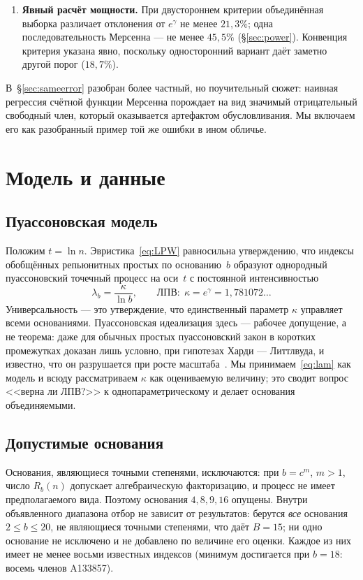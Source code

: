 \documentclass[11pt,a4paper]{article}
\theoremstyle{plain}
\theoremstyle{remark}
\newcommand{\Rb}{R_b}
\newcommand{\eg}{e^{\gamma}}
\begin{document}
\begin{enumerate}
\item\textbf{Явный расчёт мощности.} При двустороннем критерии объединённая
выборка различает отклонения от $\eg$ не менее $21{,}3\%$; одна
последовательность Мерсенна --- не менее $45{,}5\%$ (\S\ref{sec:power}).
Конвенция критерия указана явно, поскольку односторонний вариант даёт
заметно другой порог ($18{,}7\%$).
\end{enumerate}

В~\S\ref{sec:sameerror} разобран более частный, но поучительный сюжет: наивная регрессия
счётной функции Мерсенна порождает на вид значимый отрицательный свободный член,
который оказывается артефактом обусловливания. Мы включаем его как разобранный пример
той же ошибки в ином обличье.

\section{Модель и данные}\label{sec:data}

\subsection{Пуассоновская модель}
Положим $t=\ln n$. Эвристика~\eqref{eq:LPW} равносильна утверждению, что индексы
обобщённых репьюнитных простых по основанию~$b$ образуют однородный пуассоновский
точечный процесс на оси~$t$ с постоянной интенсивностью
\begin{equation}\label{eq:lam}
\lambda_b=\frac{\kappa}{\ln b},\qquad \text{ЛПВ:}\ \ \kappa=\eg=1{,}781072\ldots
\end{equation}
Универсальность --- это утверждение, что единственный параметр $\kappa$ управляет всеми
основаниями. Пуассоновская идеализация здесь --- рабочее допущение, а не теорема:
даже для обычных простых пуассоновский закон в коротких промежутках доказан лишь
условно, при гипотезах Харди --- Литтлвуда, и известно, что он разрушается при росте
масштаба~\cite{jha2026}. Мы принимаем~\eqref{eq:lam} как модель и всюду рассматриваем
$\kappa$ как оцениваемую величину; это сводит вопрос <<верна ли ЛПВ?>> к однопараметрическому и
делает основания объединяемыми.

\subsection{Допустимые основания}\label{sec:bases}
Основания, являющиеся точными степенями, исключаются: при $b=c^{m}$, $m>1$, число
$\Rb(n)$ допускает алгебраическую факторизацию, и процесс не имеет предполагаемого вида.
Поэтому основания $4,8,9,16$ опущены. Внутри объявленного диапазона отбор
не зависит от результатов: берутся \emph{все} основания $2\le b\le20$, не являющиеся
точными степенями, что даёт $B=15$; ни одно основание не исключено и не добавлено
по величине его оценки. Каждое из них имеет не менее восьми известных индексов
(минимум достигается при $b=18$: восемь членов A133857).
\end{document}

